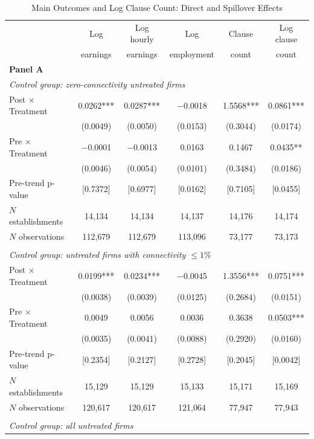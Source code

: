 \begin{table}[!htbp]
\centering
\caption{Main Outcomes and Log Clause Count: Direct and Spillover Effects}
\label{tab:main_logclauses}
\scriptsize
\begin{tabular}{lccccc}
\toprule
 & Log & Log hourly & Log & Clause & Log clause \\
 & earnings & earnings & employment & count & count \\
\midrule
\multicolumn{6}{l}{\textbf{Panel A}}\\
\multicolumn{6}{l}{\textit{Control group: zero-connectivity untreated firms}}\\
Post $\times$ Treatment & 0.0262*** & 0.0287*** & $-$0.0018 & 1.5568*** & 0.0861***\\
 & (0.0049) & (0.0050) & (0.0153) & (0.3044) & (0.0174)\\
Pre $\times$ Treatment & $-$0.0001 & $-$0.0013 & 0.0163 & 0.1467 & 0.0435**\\
 & (0.0046) & (0.0054) & (0.0101) & (0.3484) & (0.0186)\\
Pre-trend p-value & [0.7372] & [0.6977] & [0.0162] & [0.7105] & [0.0455]\\
$N$ establishments & 14{,}134 & 14{,}134 & 14{,}137 & 14{,}176 & 14{,}174\\
$N$ observations & 112{,}679 & 112{,}679 & 113{,}096 & 73{,}177 & 73{,}173\\
\addlinespace
\multicolumn{6}{l}{\textbf{Panel B}}\\
\multicolumn{6}{l}{\textit{Control group: untreated firms with connectivity $\leq 1\%$}}\\
Post $\times$ Treatment & 0.0199*** & 0.0234*** & $-$0.0045 & 1.3556*** & 0.0751***\\
 & (0.0038) & (0.0039) & (0.0125) & (0.2684) & (0.0151)\\
Pre $\times$ Treatment & 0.0049 & 0.0056 & 0.0036 & 0.3638 & 0.0503***\\
 & (0.0035) & (0.0041) & (0.0088) & (0.2920) & (0.0160)\\
Pre-trend p-value & [0.2354] & [0.2127] & [0.2728] & [0.2045] & [0.0042]\\
$N$ establishments & 15{,}129 & 15{,}129 & 15{,}133 & 15{,}171 & 15{,}169\\
$N$ observations & 120{,}617 & 120{,}617 & 121{,}064 & 77{,}947 & 77{,}943\\
\addlinespace
\multicolumn{6}{l}{\textbf{Panel C}}\\
\multicolumn{6}{l}{\textit{Control group: all untreated firms}}\\

\end{tabular}
\end{table}
